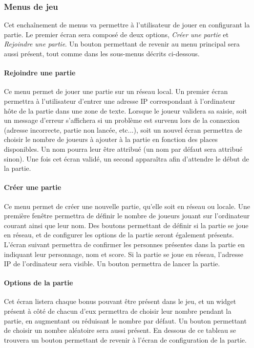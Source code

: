 \subsubsection{Menus de jeu}

Cet enchaînement de menus va permettre à l'utilisateur de jouer en configurant la partie. Le premier écran sera composé de deux options, \emph{Créer une partie} et \emph{Rejoindre une partie}. Un bouton permettant de revenir au menu principal sera aussi présent, tout comme dans les sous-menus décrits ci-dessous.

\paragraph{Rejoindre une partie}

Ce menu permet de jouer une partie sur un réseau local. Un premier écran permettra à l'utilisateur d'entrer une adresse IP correspondant à l'ordinateur hôte de la partie dans une zone de texte. Lorsque le joueur validera sa saisie, soit un message d'erreur s'affichera si un problème est survenu lors de la connexion (adresse incorrecte, partie non lancée, etc...), soit un nouvel écran permettra de choisir le nombre de joueurs à ajouter à la partie en fonction des places disponibles. Un nom pourra leur être attribué (un nom par défaut sera attribué sinon). Une fois cet écran validé, un second apparaîtra afin d'attendre le début de la partie.

\paragraph{Créer une partie}

Ce menu permet de créer une nouvelle partie, qu'elle soit en réseau ou locale. Une première fenêtre permettra de définir le nombre de joueurs jouant sur l'ordinateur courant ainsi que leur nom. Des boutons permettant de définir si la partie se joue en réseau, et de configurer les options de la partie seront également présents. L'écran suivant permettra de confirmer les personnes présentes dans la partie en indiquant leur personnage, nom et score. Si la partie se joue en réseau, l'adresse IP de l'ordinateur sera visible. Un bouton permettra de lancer la partie.

\paragraph{Options de la partie}

Cet écran listera chaque bonus pouvant être présent dans le jeu, et un widget présent à côté de chacun d'eux permettra de choisir leur nombre pendant la partie, en augmentant ou réduisant le nombre par défaut. Un bouton permettant de choisir un nombre aléatoire sera aussi présent. En dessous de ce tableau se trouvera un bouton permettant de revenir à l'écran de configuration de la partie.

